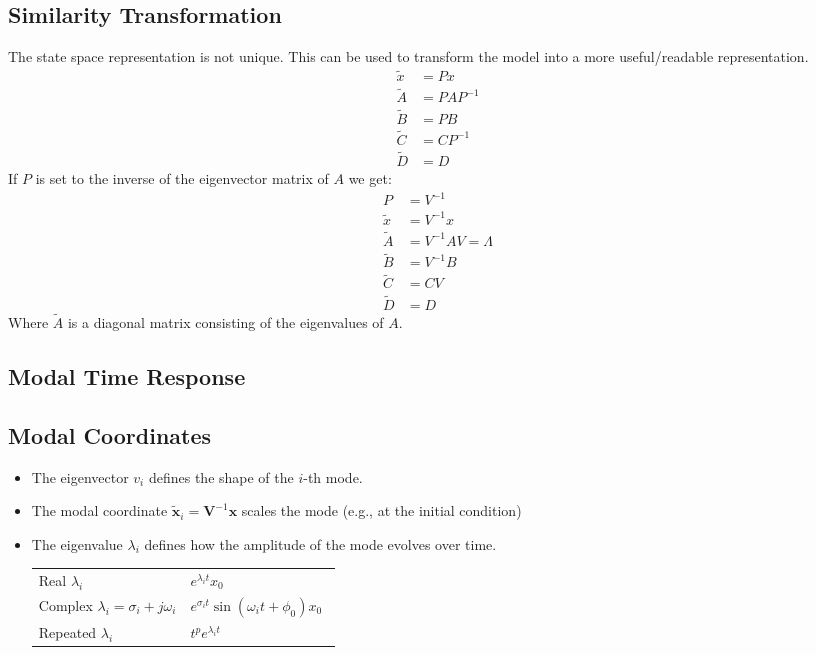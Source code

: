 \subsection{Similarity Transformation}
The state space representation is not unique. This can be used to transform the model into a more \flqq{}useful/readable\frqq{} representation.
\begin{align*}
    \tilde{x} & = Px       \\
    \tilde{A} & = PAP^{-1} \\
    \tilde{B} & = PB       \\
    \tilde{C} & = CP^{-1}  \\
    \tilde{D} & = D
\end{align*}
If $P$ is set to the inverse of the eigenvector matrix of $A$ we get:
\begin{align*}
    P         & = V^{-1}             \\
    \tilde{x} & = V^{-1}x            \\
    \tilde{A} & = V^{-1}AV = \Lambda \\
    \tilde{B} & = V^{-1}B            \\
    \tilde{C} & = CV                 \\
    \tilde{D} & = D
\end{align*}
Where $\tilde{A}$ is a diagonal matrix consisting of the eigenvalues of $A$.

\subsection{Modal Time Response}
\subsection{Modal Coordinates}
\begin{itemize}
    \item The eigenvector $v_i$ defines the shape of the $i$-th mode.
    \item The modal coordinate $\tilde{\mathbf{x}}_i=\mathbf{V}^{-1}\mathbf{x}$ scales the mode (e.g., at the initial condition)
    \item The eigenvalue $\lambda_i$ defines how the amplitude of the mode evolves over time.
          
          \begin{tabularx}{\linewidth}{@{}p{0.5\linewidth}X@{}}
              \quad Real $\lambda_i$                            & \textrightarrow{} $e^{\lambda_i t}x_0$                         \\
              \quad Complex $\lambda_i = \sigma_i + j \omega_i$ & \textrightarrow{} $e^{\sigma_i t}\sin(\omega_i t + \phi_0)x_0$ \\
              \quad Repeated $\lambda_i$                        & \textrightarrow{} $t^p e^{\lambda_i t}$
          \end{tabularx}
\end{itemize}

